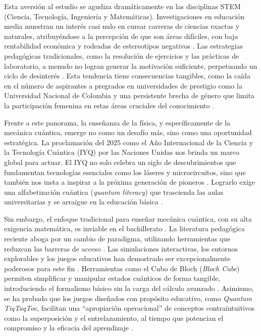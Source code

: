\documentclass[10pt,a4paper]{article}
\begin{document}
Esta aversión al estudio se agudiza dramáticamente en las disciplinas STEM (Ciencia, Tecnología, Ingeniería y Matemáticas). Investigaciones en educación media muestran un interés casi nulo en cursar carreras de ciencias exactas y naturales, atribuyéndose a la percepción de que son áreas difíciles, con baja rentabilidad económica y rodeadas de estereotipos negativos \cite{Mendez2023}. Las estrategias pedagógicas tradicionales, como la resolución de ejercicios y las prácticas de laboratorio, a menudo no logran generar la motivación suficiente, perpetuando un ciclo de desinterés \cite{Mendez2023}. Esta tendencia tiene consecuencias tangibles, como la caída en el número de aspirantes a pregrados en universidades de prestigio como la Universidad Nacional de Colombia \cite{UNAL2025} y una persistente brecha de género que limita la participación femenina en estas áreas cruciales del conocimiento \cite{Esteve2017}.
\vspace{1em}

Frente a este panorama, la enseñanza de la física, y específicamente de la mecánica cuántica, emerge no como un desafío más, sino como una oportunidad estratégica. La proclamación del 2025 como el Año Internacional de la Ciencia y la Tecnología Cuántica (IYQ) por las Naciones Unidas \cite{LaCienciaCuanticaBrillara2025} nos brinda un marco global para actuar. El IYQ no solo celebra un siglo de descubrimientos que fundamentan tecnologías esenciales como los láseres y microcircuitos, sino que también nos insta a inspirar a la próxima generación de pioneros \cite{LaCienciaCuanticaBrillara2025}. Lograrlo exige una alfabetización cuántica (\textit{quantum literacy}) que trascienda las aulas universitarias y se arraigue en la educación básica \cite{VisualizingQuantumMechanics2022}.

Sin embargo, el enfoque tradicional para enseñar mecánica cuántica, con su alta exigencia matemática, es inviable en el bachillerato \cite{TeachingQuantumFormalism2024}. La literatura pedagógica reciente aboga por un cambio de paradigma, utilizando herramientas que reduzcan las barreras de acceso \cite{TeachingQuantumFormalism2024}. Las simulaciones interactivas, los entornos explorables y los juegos educativos han demostrado ser excepcionalmente poderosos para este fin \cite{VisualizingQuantumMechanics2022, GamesForTeaching2022}. Herramientas como el Cubo de Bloch (\textit{Bloch Cube}) permiten simplificar y manipular estados cuánticos de forma tangible, introduciendo el formalismo básico sin la carga del cálculo avanzado \cite{TeachingQuantumFormalism2024}. Asimismo, se ha probado que los juegos diseñados con propósito educativo, como \textit{Quantum TiqTaqToe}, facilitan una ``apropiación operacional'' de conceptos contraintuitivos como la superposición y el entrelazamiento, al tiempo que potencian el compromiso y la eficacia del aprendizaje \cite{GamesForTeaching2022}.\\
\end{document}
